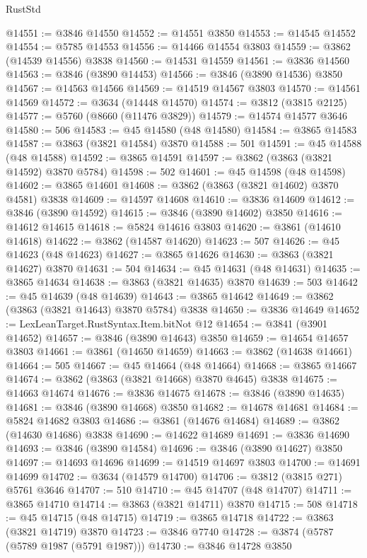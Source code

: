 \begin{lexlean}{RustStd}
\begin{coremodule}
@14551 := @3846 @14550
@14552 := @14551 @3850
@14553 := @14545 @14552
@14554 := @5785 @14553
@14556 := @14466 @14554 @3803
@14559 := @3862 (@14539 @14556) @3838
@14560 := @14531 @14559
@14561 := @3836 @14560
@14563 := @3846 (@3890 @14453)
@14566 := @3846 (@3890 @14536) @3850
@14567 := @14563 @14566
@14569 := @14519 @14567 @3803
@14570 := @14561 @14569
@14572 := @3634 (@14448 @14570)
@14574 := @3812 (@3815 @2125)
@14577 := @5760 (@8660 (@11476 @3829))
@14579 := @14574 @14577 @3646
@14580 := 506
@14583 := @45 @14580 (@48 @14580)
@14584 := @3865 @14583
@14587 := @3863 (@3821 @14584) @3870
@14588 := 501
@14591 := @45 @14588 (@48 @14588)
@14592 := @3865 @14591
@14597 := @3862 (@3863 (@3821 @14592) @3870 @5784)
@14598 := 502
@14601 := @45 @14598 (@48 @14598)
@14602 := @3865 @14601
@14608 := @3862 (@3863 (@3821 @14602) @3870 @4581) @3838
@14609 := @14597 @14608
@14610 := @3836 @14609
@14612 := @3846 (@3890 @14592)
@14615 := @3846 (@3890 @14602) @3850
@14616 := @14612 @14615
@14618 := @5824 @14616 @3803
@14620 := @3861 (@14610 @14618)
@14622 := @3862 (@14587 @14620)
@14623 := 507
@14626 := @45 @14623 (@48 @14623)
@14627 := @3865 @14626
@14630 := @3863 (@3821 @14627) @3870
@14631 := 504
@14634 := @45 @14631 (@48 @14631)
@14635 := @3865 @14634
@14638 := @3863 (@3821 @14635) @3870
@14639 := 503
@14642 := @45 @14639 (@48 @14639)
@14643 := @3865 @14642
@14649 := @3862 (@3863 (@3821 @14643) @3870 @5784) @3838
@14650 := @3836 @14649
@14652 := LexLeanTarget.RustSyntax.Item.bitNot @12
@14654 := @3841 (@3901 @14652)
@14657 := @3846 (@3890 @14643) @3850
@14659 := @14654 @14657 @3803
@14661 := @3861 (@14650 @14659)
@14663 := @3862 (@14638 @14661)
@14664 := 505
@14667 := @45 @14664 (@48 @14664)
@14668 := @3865 @14667
@14674 := @3862 (@3863 (@3821 @14668) @3870 @4645) @3838
@14675 := @14663 @14674
@14676 := @3836 @14675
@14678 := @3846 (@3890 @14635)
@14681 := @3846 (@3890 @14668) @3850
@14682 := @14678 @14681
@14684 := @5824 @14682 @3803
@14686 := @3861 (@14676 @14684)
@14689 := @3862 (@14630 @14686) @3838
@14690 := @14622 @14689
@14691 := @3836 @14690
@14693 := @3846 (@3890 @14584)
@14696 := @3846 (@3890 @14627) @3850
@14697 := @14693 @14696
@14699 := @14519 @14697 @3803
@14700 := @14691 @14699
@14702 := @3634 (@14579 @14700)
@14706 := @3812 (@3815 @271) @5761 @3646
@14707 := 510
@14710 := @45 @14707 (@48 @14707)
@14711 := @3865 @14710
@14714 := @3863 (@3821 @14711) @3870
@14715 := 508
@14718 := @45 @14715 (@48 @14715)
@14719 := @3865 @14718
@14722 := @3863 (@3821 @14719) @3870
@14723 := @3846 @7740
@14728 := @3874 (@5787 (@5789 @1987 (@5791 @1987)))
@14730 := @3846 @14728 @3850

\end{coremodule}
\end{lexlean}
